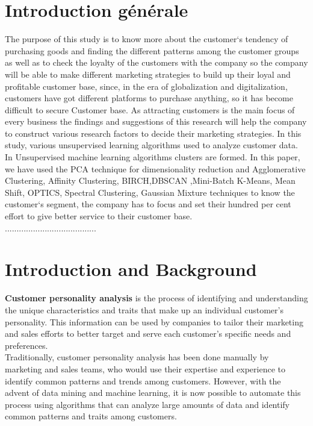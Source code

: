 \documentclass[12pt,a4paper]{report}
\begin{document}
\chapter*{Introduction générale}

The purpose of this study is to know more about the customer‘s tendency of
purchasing goods and finding the different patterns among the customer groups as well as to
check the loyalty of the customers with the company so the company will be able to make
different marketing strategies to build up their loyal and profitable customer base, since, in
the era of globalization and digitalization, customers have got different platforms to purchase
anything, so it has become difficult to secure Customer base. As attracting customers is the
main focus of every business the findings and suggestions of this research will help the
company to construct various research factors to decide their marketing strategies. In this
study, various unsupervised learning algorithms used to analyze customer data. In
Unsupervised machine learning algorithms clusters are formed. In this paper, we have used
the PCA technique for dimensionality reduction and Agglomerative Clustering, Affinity Clustering, BIRCH,DBSCAN ,Mini-Batch K-Means, Mean Shift, OPTICS, Spectral Clustering, Gaussian Mixture
techniques to know the customer‘s segment, the company has to focus and set their hundred
per cent effort to give better service to their customer base.\\



.......................................

\chapter{Introduction and Background}

\minitoc
\textbf{Customer personality analysis}  is the process of identifying and understanding the unique
characteristics and traits that make up an individual customer's personality. This information can
be used by companies to tailor their marketing and sales efforts to better target and serve each
customer's specific needs and preferences.\\

Traditionally, customer personality analysis has been done manually by marketing and sales teams,
who would use their expertise and experience to identify common patterns and trends among
customers. However, with the advent of data mining and machine learning, it is now possible to
automate this process using algorithms that can analyze large amounts of data and identify
common patterns and traits among customers. \\
\end{document}

